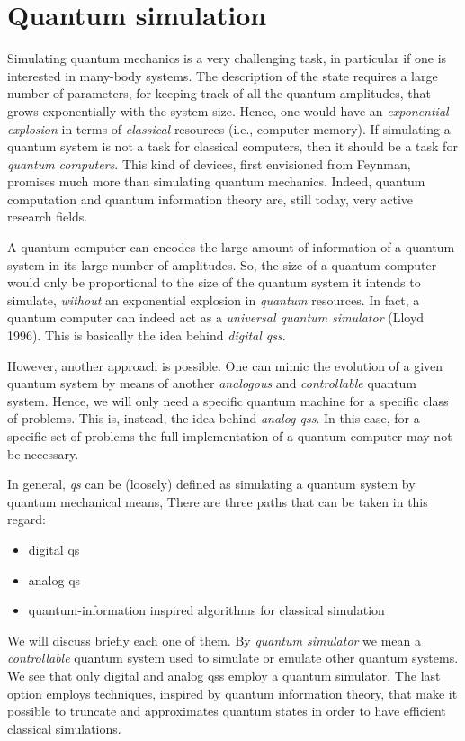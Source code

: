 \section{Quantum simulation}
\label{sec:quantum_simulation}

Simulating quantum mechanics is a very challenging task, in particular if one is interested in many-body systems.
The description of the state requires a large number of parameters, for keeping track of all the quantum amplitudes, that grows exponentially with the system size.
Hence, one would have an \emph{exponential explosion} in terms of \emph{classical} resources (i.e., computer memory).
If simulating a quantum system is not a task for classical computers, then it should be a task for \emph{quantum computers}.
This kind of devices, first envisioned from Feynman\citneeded, promises much more than simulating quantum mechanics.
Indeed, quantum computation and quantum information theory are, still today, very active research fields.

A quantum computer can encodes the large amount of information of a quantum system in its large number of amplitudes.
So, the size of a quantum computer would only be proportional to the size of the quantum system it intends to simulate, \emph{without} an exponential explosion in \emph{quantum} resources.
In fact, a quantum computer can indeed act as a \emph{universal quantum simulator} (Lloyd 1996\citneeded).
This is basically the idea behind \emph{digital \ac{qs}s}.

However, another approach is possible.
One can mimic the evolution of a given quantum system by means of another \emph{analogous} and \emph{controllable} quantum system.
Hence, we will only need a specific quantum machine for a specific class of problems.
This is, instead, the idea behind \emph{analog \ac{qs}s}.
In this case, for a specific set of problems the full implementation of a quantum computer may not be necessary.

In general, \emph{\ac{qs}} can be (loosely) defined as simulating a quantum system by quantum mechanical means,
There are three paths that can be taken in this regard:
\begin{itemize}
    \item digital \ac{qs}
    \item analog \ac{qs}
    \item quantum-information inspired algorithms for classical simulation
\end{itemize}
We will discuss briefly each one of them.
By \emph{quantum simulator} we mean a \emph{controllable} quantum system used to simulate or emulate other quantum systems.
We see that only digital and analog \ac{qs}s employ a quantum simulator.
The last option employs techniques, inspired by quantum information theory, that make it possible to truncate and approximates quantum states in order to have efficient classical simulations.


